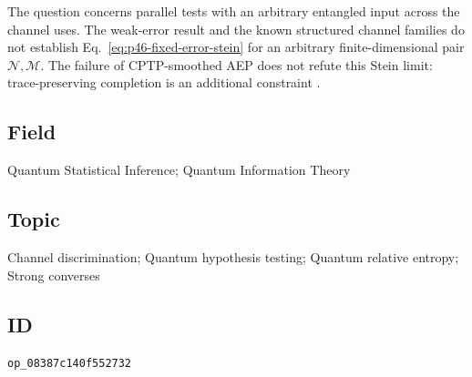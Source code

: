 The question concerns parallel tests with an arbitrary entangled input across
the channel uses.  The weak-error result and the known structured channel
families do not establish Eq.~\eqref{eq:p46-fixed-error-stein} for an arbitrary
finite-dimensional pair $\mathcal N,\mathcal M$.
The failure of CPTP-smoothed AEP does not refute this
Stein limit: trace-preserving completion is an additional constraint
.

\subsection*{Field}

Quantum Statistical Inference; Quantum Information Theory

\subsection*{Topic}

Channel discrimination; Quantum hypothesis testing; Quantum relative entropy; Strong converses

\subsection*{ID}

\texttt{op\_08387c140f552732}
